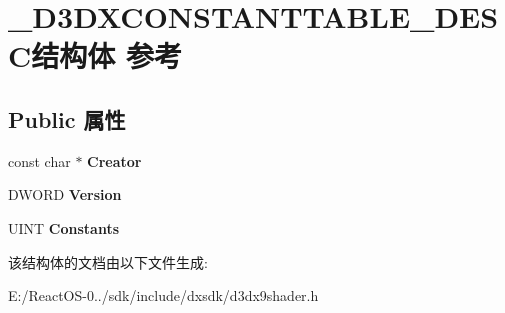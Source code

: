 \hypertarget{struct___d3_d_x_c_o_n_s_t_a_n_t_t_a_b_l_e___d_e_s_c}{}\section{\+\_\+\+D3\+D\+X\+C\+O\+N\+S\+T\+A\+N\+T\+T\+A\+B\+L\+E\+\_\+\+D\+E\+S\+C结构体 参考}
\label{struct___d3_d_x_c_o_n_s_t_a_n_t_t_a_b_l_e___d_e_s_c}
\subsection*{Public 属性}
\begin{DoxyCompactItemize}
\item 
\mbox{\label{struct___d3_d_x_c_o_n_s_t_a_n_t_t_a_b_l_e___d_e_s_c_a40f3497a2ab44079ddae319ac5766f10}} 
const char $\ast$ {\bfseries Creator}
\item 
\mbox{\label{struct___d3_d_x_c_o_n_s_t_a_n_t_t_a_b_l_e___d_e_s_c_afd31a39700a7872cef751019d8b8c18e}} 
D\+W\+O\+RD {\bfseries Version}
\item 
\mbox{\label{struct___d3_d_x_c_o_n_s_t_a_n_t_t_a_b_l_e___d_e_s_c_a5bb69fff4482d41b8830a1cc3236888c}} 
U\+I\+NT {\bfseries Constants}
\end{DoxyCompactItemize}


该结构体的文档由以下文件生成\+:\begin{DoxyCompactItemize}
\item 
E\+:/\+React\+O\+S-\/0../sdk/include/dxsdk/d3dx9shader.\+h\end{DoxyCompactItemize}
